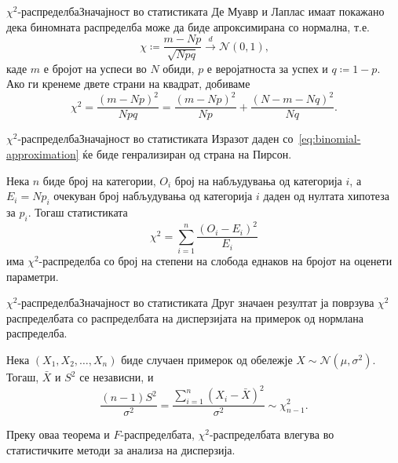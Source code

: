 \documentclass[hyperref={unicode}, xcolor={svgnames, table},
usepdftitle=false]{beamer}
\theoremstyle{remark}
\begin{document}
\begin{frame}{\(\chi^2\)-распределба}{Значајност во статистиката}
  Де Муавр и Лаплас имаат покажано дека биномната распределба може да биде
  апроксимирана со нормална, т.е.
  \[
    \chi \coloneqq \frac{m - N p}{\sqrt{N p q}} \xrightarrow{d} \mathcal{N}(0, 1)\text{,}
  \]
  каде \(m\) е бројот на успеси во \(N\) обиди, \(p\) е веројатноста за успех и
  \(q \coloneqq 1 - p\).  Ако ги кренеме двете страни на квадрат, добиваме
  \begin{equation}\label{eq:binomial-approximation}
    \chi^2 = \frac{(m - N p)^2}{N p q} = \frac{(m - N p)^2}{N p} + \frac{(N - m
      - N q)^2}{N q}\text{.}
  \end{equation}
\end{frame}

\begin{frame}{\(\chi^2\)-распределба}{Значајност во статистиката}
  Изразот даден со~\eqref{eq:binomial-approximation} ќе биде генрализиран од
  страна на Пирсон.
  \begin{theorem}
    Нека \(n\) биде број на категории, \(O_i\) број на набљудувања од категорија
    \(i\), а \(E_i = N p_i\) очекуван број набљудувања од категорија \(i\) даден
    од нултата хипотеза за \(p_i\).  Тогаш статистиката
    \[
      \chi^2 = \sum\limits_{i = 1}^{n} \frac{(O_i - E_i)^2}{E_i}
    \]
    има \(\chi^2\)-распределба со број на степени на слобода еднаков на бројот
    на оценети параметри.
  \end{theorem}
\end{frame}

\begin{frame}{\(\chi^2\)-распределба}{Значајност во статистиката}
  Друг значаен резултат ја поврзува \(\chi^2\) распределбата со распределбата на
  дисперзијата на примерок од нормлана распределба.
  \begin{theorem}
    Нека \((X_1, X_2, \ldots, X_n)\) биде случаен примерок од обележје
    \(X \sim \mathcal{N}(\mu, \sigma^2)\).  Тогаш, \(\bar{X}\) и \(S^2\) се
    независни, и
    \[
      \frac{(n - 1) S^2}{\sigma^2} = \frac{\sum\nolimits_{i = 1}^{n} (X_i -
        \bar{X})^2}{\sigma^2} \sim \chi^2_{n - 1}\text{.}
    \]
  \end{theorem}
  Преку оваа теорема и \(F\)-распределбата, \(\chi^2\)-распределбата влегува во
  статистичките методи за анализа на дисперзија.
\end{frame}
\end{document}
